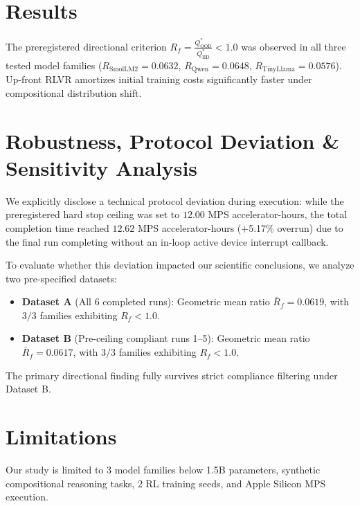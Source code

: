 \documentclass{article}
\begin{document}
\section{Results}
The preregistered directional criterion $R_f = \frac{Q^*_{\text{OOD}}}{Q^*_{\text{IID}}} < 1.0$ was observed in all three tested model families ($R_{\text{SmolLM2}} = 0.0632$, $R_{\text{Qwen}} = 0.0648$, $R_{\text{TinyLlama}} = 0.0576$). Up-front RLVR amortizes initial training costs significantly faster under compositional distribution shift.

\section{Robustness, Protocol Deviation \& Sensitivity Analysis}
We explicitly disclose a technical protocol deviation during execution: while the preregistered hard stop ceiling was set to $12.00$ MPS accelerator-hours, the total completion time reached $12.62$ MPS accelerator-hours (+5.17\% overrun) due to the final run completing without an in-loop active device interrupt callback. 

To evaluate whether this deviation impacted our scientific conclusions, we analyze two pre-specified datasets:
\begin{itemize}
    \item \textbf{Dataset A} (All 6 completed runs): Geometric mean ratio $\bar{R}_f = 0.0619$, with $3/3$ families exhibiting $R_f < 1.0$.
    \item \textbf{Dataset B} (Pre-ceiling compliant runs 1--5): Geometric mean ratio $\bar{R}_f = 0.0617$, with $3/3$ families exhibiting $R_f < 1.0$.
\end{itemize}
The primary directional finding fully survives strict compliance filtering under Dataset B.

\section{Limitations}
Our study is limited to 3 model families below 1.5B parameters, synthetic compositional reasoning tasks, 2 RL training seeds, and Apple Silicon MPS execution.



\end{document}
